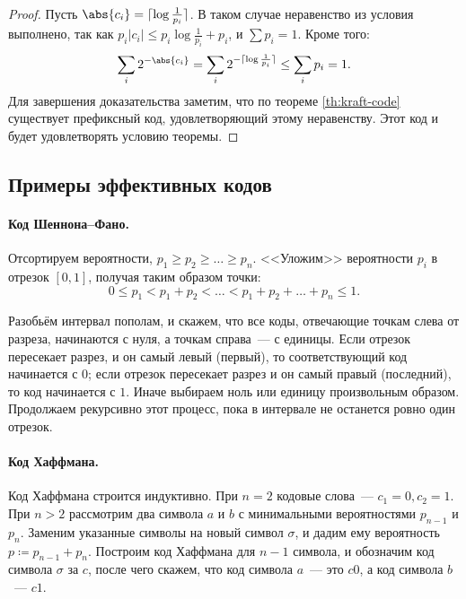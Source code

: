 \begin{proof}
    Пусть $\abs{c_i} = \lceil \log\frac{1}{p_i} \rceil$. В таком случае неравенство из условия выполнено,
    так как $p_i|c_i| \leq p_i\log\frac{1}{p_i} + p_i$, и $ \sum p_i = 1$. Кроме того:
    $$
    \sum_i 2^{-\abs{c_i}} = \sum_i 2^{-\lceil \log\frac{1}{p_i}\rceil} \le \sum_i p_i = 1.
    $$
    Для завершения доказательства заметим, что по теореме \ref{th:kraft-code} существует префиксный код,
    удовлетворяющий этому неравенству. Этот код и будет удовлетворять условию теоремы.
\end{proof}


\subsection{Примеры эффективных кодов}

\paragraph{Код Шеннона--Фано.}
Отсортируем вероятности, $ p_1 \ge p_2 \ge \dots \ge p_n$. <<Уложим>> вероятности $p_i$ в отрезок $[0,
1]$, получая таким образом точки:
$$
0 \le p_1 < p_1 + p_2 < \dots < p_1 + p_2 + \dots + p_n \le 1.
$$ 

Разобьём интервал пополам, и скажем, что все коды, отвечающие точкам слева от разреза, начинаются с нуля,
а точкам справа~--- с единицы. Если отрезок пересекает разрез, и он самый левый (первый), то
соответствующий код начинается с $0$; если отрезок пересекает разрез и он самый правый (последний), то
код начинается с $1$. Иначе выбираем ноль или единицу произвольным образом. Продолжаем рекурсивно этот
процесс, пока в интервале не останется ровно один отрезок. 

    


\paragraph{Код Хаффмана.} Код Хаффмана строится индуктивно. При $n = 2$ кодовые слова~--- $c_1 = 0, c_2 =
1$. При $n > 2$ рассмотрим два символа $a$ и $b$ с минимальными вероятностями $p_{n - 1}$ и
$p_n$. Заменим указанные символы на новый символ $\sigma$, и дадим ему вероятность $p \coloneqq p_{n - 1}
+ p_n$. Построим код Хаффмана для $n - 1$ символа, и обозначим код символа $\sigma$ за $c$, после чего
скажем, что код символа $a$~--- это $c0$, а код символа $b$~--- $c1$.


